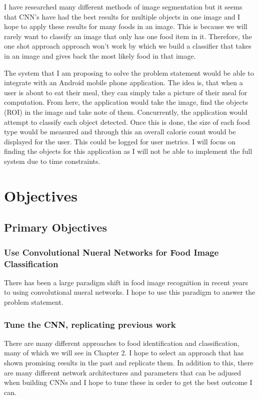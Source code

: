 I have researched many different methods of image segmentation but it seems that CNN's have had the best results for multiple objects in one image and I hope to apply these results for many foods in an image.
This is because we will rarely want to classify an image that only has one food
item in it. Therefore, the one shot approach approach won't work by which we
build a classifier that takes in an image and gives back the most likely food in
that image.

The system that I am proposing to solve the problem statement would be able to
integrate with an Android mobile phone application.
The idea is, that when a user is about to eat their meal, they can simply take a picture of their meal for computation.
From here, the application would take the image, find the objects (ROI) in the image and take note of them.
Concurrently, the application would attempt to classify each object detected.
Once this is done, the size of each food type would be measured and through this an overall calorie count would be displayed for the user.
This could be logged for user metrics. 
I will focus on finding the objects for this application as I will not be able to implement the full system due to time constraints.

\section{Objectives}
\subsection*{Primary Objectives}
\subsubsection*{Use Convolutional Nueral Networks for Food Image Classification}
There has been a large paradigm shift in food image recognition in recent years to using convolutional nueral networks. I hope to use this paradigm to answer the problem statement.

\subsubsection*{Tune the CNN, replicating previous work}
There are many different approaches to food identification and classification,
many of which we will see in Chapter 2. I hope to select an approach that has
shown promising results in the past and replicate them. In addition to this, there are many different network architectures and parameters that can be adjused when building CNNs and I hope to tune these in order to get the best outcome I can.

